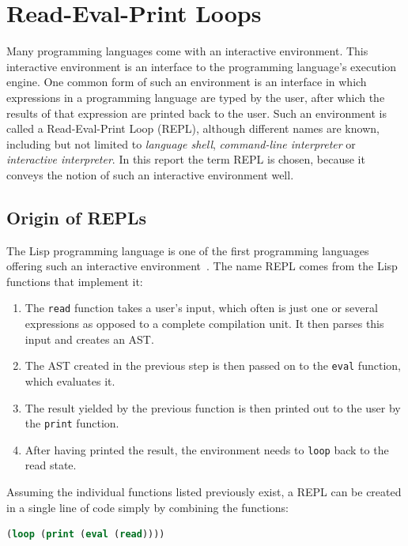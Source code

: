 \section{Read-Eval-Print Loops}
\label{sec:repl}

Many programming languages come with an interactive environment. This
interactive environment is an interface to the programming language's execution
engine. One common form of such an environment is an interface in which
expressions in a programming language are typed by the user, after which the
results of that expression are printed back to the user. Such an environment is
called a Read-Eval-Print Loop (REPL), although different names are known,
including but not limited to \emph{language shell}, \emph{command-line
  interpreter} or \emph{interactive interpreter}. In this report the term REPL
is chosen, because it conveys the notion of such an interactive environment
well.

\subsection{Origin of REPLs}
\label{ssec:repl-origin}

The Lisp programming language is one of the first programming languages offering
such an interactive environment~\cite{Noyes92}. The name REPL comes from the
Lisp functions that implement it:

\begin{enumerate}
  \item The \texttt{read} function takes a user's input, which often is just one
    or several expressions as opposed to a complete compilation unit. It then
    parses this input and creates an AST.
  \item The AST created in the previous step is then passed on to the
    \texttt{eval} function, which evaluates it.
  \item The result yielded by the previous function is then printed out to the
    user by the \texttt{print} function.
  \item After having printed the result, the environment needs to \texttt{loop}
    back to the read state.
\end{enumerate}

Assuming the individual functions listed previously exist, a REPL can be created
in a single line of code simply by combining the functions:

\begin{lstlisting}[language=lisp]
(loop (print (eval (read))))
\end{lstlisting}

